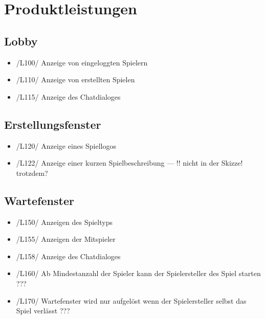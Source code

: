 \documentclass{article}
\begin{document}
\section{Produktleistungen}
\subsection{\gls{Lobby}}
\begin{itemize}
	\item /L100/ Anzeige von eingeloggten Spielern
	\item /L110/ Anzeige von erstellten Spielen	
	\item /L115/ Anzeige des Chatdialoges		
\end{itemize}

\subsection{Erstellungsfenster}
\begin{itemize}
	\item /L120/ Anzeige eines Spiellogos
	\item /L122/ Anzeige einer kurzen Spielbeschreibung --- !! nicht in der Skizze! trotzdem?
\end{itemize}

\subsection{Wartefenster}
\begin{itemize}
	\item /L150/ Anzeigen des Spieltyps
	\item /L155/ Anzeigen der Mitspieler
	\item /L158/ Anzeige des Chatdialoges
	\item /L160/ Ab Mindestanzahl der Spieler kann der Spielersteller des Spiel starten ???
	\item /L170/ \gls{Wartefenster} wird nur aufgelöst wenn der Spielersteller selbst das Spiel verlässt ???
\end{itemize}
\end{document}
